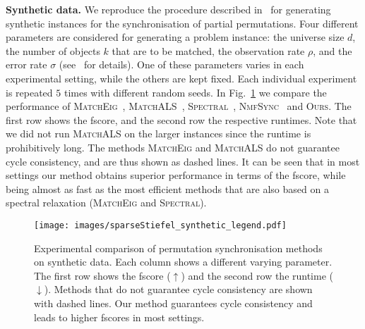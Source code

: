 \documentclass{article}
\begin{document}
\textbf{Synthetic data.} We reproduce the procedure described  in~\cite{bernard2019synchronisation} for generating synthetic instances for the synchronisation of partial permutations. Four different parameters are considered for generating a problem instance: the universe size $d$, the number of objects $k$ that are to be matched, the observation rate $\rho$, and the error rate $\sigma$ (see~\cite{bernard2019synchronisation} for details).  %
One of these parameters varies in each experimental setting, while the others are kept fixed. Each individual experiment is repeated $5$ times with different random seeds. In Fig.~\ref{fig:synthetic} we compare the performance of \textsc{MatchEig}~\cite{Maset:YO8y6VRb}, \textsc{MatchALS}~\cite{zhou2015multi}, \textsc{Spectral}~\cite{Pachauri:2013wx}, \textsc{NmfSync}~\cite{bernard2019synchronisation} and \textsc{Ours}.
%
The first row shows the fscore, and the second row the respective runtimes. Note that we did not run \textsc{MatchALS} on the larger instances since the runtime is prohibitively long. The methods \textsc{MatchEig} and \textsc{MatchALS} do not guarantee cycle consistency, and are thus shown as dashed lines. It can be seen that in most settings our method obtains superior performance in terms of the fscore, while being almost as fast as the most efficient methods that are also based on a spectral relaxation (\textsc{MatchEig} and \textsc{Spectral}).
%
\newcommand{\figWidth}{3.7cm}
\begin{figure}[ht!] 
    \centerline{\texttt{[image: images/sparseStiefel\_synthetic\_legend.pdf]}}
     \centerline{ 
      }%
    \centerline{%
      }%
    \caption{Experimental comparison of permutation synchronisation methods on synthetic data. Each column shows a different varying parameter. The first row shows the fscore ($\uparrow$) and the second row the runtime ($\downarrow$). Methods that do not guarantee cycle consistency are shown with dashed lines. Our method guarantees cycle consistency and leads to higher fscores in most settings.} 
    \label{fig:synthetic}
\end{figure} 
\end{document}
